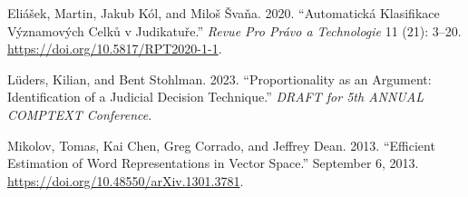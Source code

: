 \documentclass[
  11pt,
]{article}
\newlength{\cslhangindent}
\newenvironment{CSLReferences}[2] %
 {%
  \setlength{\parindent}{0pt}
  \ifodd #1 \everypar{\setlength{\hangindent}{\cslhangindent}}\ignorespaces\fi
  \ifnum #2 > 0
  \setlength{\parskip}{#2\baselineskip}
  \fi
 }%
 {}
\begin{document}
\hypertarget{refs}{}
\begin{CSLReferences}{1}{0}
\leavevmode{}%
Eliášek, Martin, Jakub Kól, and Miloš Švaňa. 2020. {``Automatická
Klasifikace Významových Celků v Judikatuře.''} \emph{Revue Pro Právo a
Technologie} 11 (21): 3--20. \url{https://doi.org/10.5817/RPT2020-1-1}.

\leavevmode{}%
Lüders, Kilian, and Bent Stohlman. 2023. {``Proportionality as an
Argument: {Identification} of a Judicial Decision Technique.''}
\emph{DRAFT for 5th ANNUAL COMPTEXT Conference}.

\leavevmode{}%
Mikolov, Tomas, Kai Chen, Greg Corrado, and Jeffrey Dean. 2013.
{``Efficient {Estimation} of {Word Representations} in {Vector
Space}.''} September 6, 2013.
\url{https://doi.org/10.48550/arXiv.1301.3781}.

\end{CSLReferences}
\end{document}
